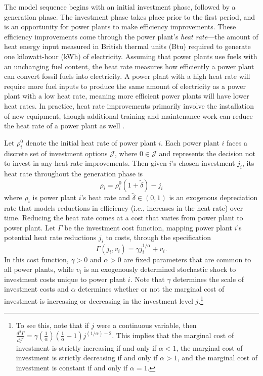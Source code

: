 The model sequence begins with an initial investment phase, followed by a generation phase. The investment phase takes place prior to the first period, and is an opportunity for power plants to make efficiency improvements. These efficiency improvements come through the power plant's \emph{heat rate}---the amount of heat energy input measured in British thermal units (Btu) required to generate one kilowatt-hour (kWh) of electricity. Assuming that power plants use fuels with an unchanging fuel content, the heat rate measures how efficiently a power plant can convert fossil fuels into electricity. A power plant with a high heat rate will require more fuel inputs to produce the same amount of electricity as a power plant with a low heat rate, meaning more efficient power plants will have lower heat rates. In practice, heat rate improvements primarily involve the installation of new equipment, though additional training and maintenance work can reduce the heat rate of a power plant as well \citep{eia_heatrate}. 

Let $\rho_i^0$ denote the initial heat rate of power plant $i$. Each power plant $i$ faces a discrete set of investment options $\mathcal{J}$, where $0 \in \mathcal{J}$ and represents the decision not to invest in any heat rate improvements. Then given $i$'s chosen investment $j_i$, its heat rate throughout the generation phase is
\begin{equation}
    \rho_i = \rho_i^0 (1 + \tilde{\delta}) - j_i
\end{equation}
where $\rho_i$ is power plant $i$'s heat rate and $\tilde{\delta} \in (0, 1)$ is an exogenous depreciation rate that models reductions in efficiency (i.e., increases in the heat rate) over time. Reducing the heat rate comes at a cost that varies from power plant to power plant. Let $\Gamma$ be the investment cost function, mapping power plant $i$'s potential heat rate reductions $j_i$ to costs, through the specification 
\begin{equation}
    \Gamma (j_i, v_i) = \gamma j_i^{1/\alpha} + v_i.
\end{equation}
In this cost function, $\gamma > 0$ and $\alpha > 0$ are fixed parameters that are common to all power plants, while $v_i$ is an exogenously determined stochastic shock to investment costs unique to power plant $i$. Note that $\gamma$ determines the scale of investment costs and $\alpha$ determines whether or not the marginal cost of investment is increasing or decreasing in the investment level $j$.\footnote{To see this, note that if $j$ were a continuous variable, then $\frac{d^2\Gamma}{dj^2} = \gamma \left(\frac{1}{\alpha}\right) \left( \frac{1}{\alpha} -1\right) j^{(1/\alpha) - 2}$. This implies that the marginal cost of investment is strictly increasing if and only if $\alpha < 1$, the marginal cost of investment is strictly decreasing if and only if $\alpha > 1$, and the marginal cost of investment is constant if and only if $\alpha = 1$.} 

